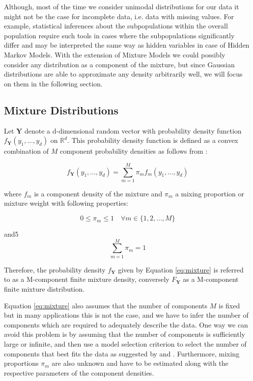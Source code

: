 Although, most of the time we consider unimodal distributions for our data it might not be the case for incomplete data, i.e. data with missing values.
For example, statistical inferences about the subpopulations within the overall population require such tools in cases where the subpopulations significantly differ 
and may be interpreted the same way as hidden variables in case of Hidden Markov Models. With the extension of Mixture Models we could possibly consider any
distribution as a component of the mixture, but since Gaussian distributions are able to approximate any density arbitrarily well, we will focus on them in the following section.

\subsection{Mixture Distributions}

Let $\textbf{Y}$ denote a d-dimensional random vector with probability density function $f_{\textbf{Y}}(y_1,\ldots,y_d)$ on $\mathbb{R}^d$. 
This probability density function is defined as a convex combination of $M$ component probability densities as follows from \citep{McLachlan2000}: 

\begin{equation} \label{eq:mixture}
    f_{\textbf{Y}}(y_1,\ldots,y_d) = \sum_{m=1}^{M} \pi_m f_m(y_1,\ldots,y_d)
\end{equation}

where $f_m$ is a component density of the mixture and $\pi_m$ a mixing proportion or mixture weight with following properties:

\begin{equation}
    0 \leq \pi_m \leq 1 \quad \forall m \in \{1,2,\ldots,M\}
\end{equation}

and5
\begin{equation}
    \sum_{m=1}^{M} \pi_m = 1
\end{equation}

Therefore, the probability density $f_{\textbf{Y}}$ given by Equation \ref{eq:mixture} is referred to as a M-component finite mixture density, conversely $F_{\textbf{Y}}$ 
as a M-component finite mixture distribution. 

Equation \ref{eq:mixture} also assumes that the number of components $M$ is fixed but in many applications this is not the case, and we have to infer 
the number of components which are required to adequately describe the data. One way we can avoid this problem is by assuming that the number of components is 
sufficiently large or infinite, and then use a model selection criterion to select the number of components that best fits the data as suggested by \citep{Sammut2011} and \citep{Rasmussen1999}.
Furthermore, mixing proportions $\pi_m$ are also unknown and have to be estimated along with the respective parameters of the component densities.


